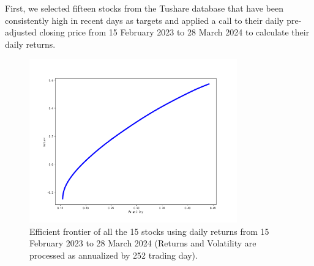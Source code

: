 \documentclass[default,iicol]{sn-jnl}%
\begin{document}
First, we selected fifteen stocks from the Tushare database that have been consistently high in recent days as targets and applied a call to their daily pre-adjusted closing price from 15 February 2023 to 28 March 2024 to calculate their daily returns.
\begin{figure}[htbp]
	\centering    
	\includegraphics[width = 0.8\textwidth]{figures/Fig 8.png}
	\caption{Efficient frontier of all the 15 stocks using daily returns from 15 February 2023 to 28 March 2024 (Returns and Volatility are processed as annualized by 252 trading day).}
	\label{fg8}
\end{figure} 
\end{document}
